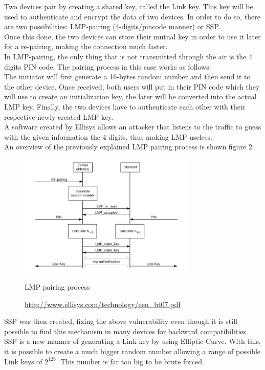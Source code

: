 Two devices pair by creating a shared key, called the Link key. This key will be used to authenticate and encrypt the data of two devices.
In order to do so, there are two possibilities: LMP-pairing (4-digits/pincode manner) or SSP. \\
Once this done, the two devices can store their mutual key in order to use it later for a re-pairing, making the connection much faster.\\
In LMP-pairing, the only thing that is not transmitted through the air is the 4 digits PIN code. The pairing process in this case works as follows: \\
The initiator will first generate a 16-bytes random number and then send it to the other device. Once received, both users will put in their PIN code which they will use to create an initialization key, the later will be converted into the actual LMP key. Finally, the two devices have to authenticate each other with their respective newly created LMP key. \\
A software created by Ellisys \cite{ellisys} allows an attacker that listens to the traffic to guess with the given information the 4 digits, thus making LMP useless. \\
An overview of the previously explained LMP pairing process is shown figure 2: 
\begin{figure}[!h]
  \begin{center}
	\includegraphics[width=320px]{images/haha.png}
	\label{LMP pairing}
	\caption{LMP pairing process}
	\caption*{\url{http://www.ellisys.com/technology/een_bt07.pdf}}
  \end{center}
\end{figure}


SSP was then created, fixing the above vulnerability even though it is still possible to find this mechanism in many devices for backward compatibilities. \\
SSP is a new manner of generating a Link key by using Elliptic Curve. With this, it is possible to create a much bigger random number allowing a range of possible Link keys of $2^{128}$. This number is far too big to be brute forced. 

